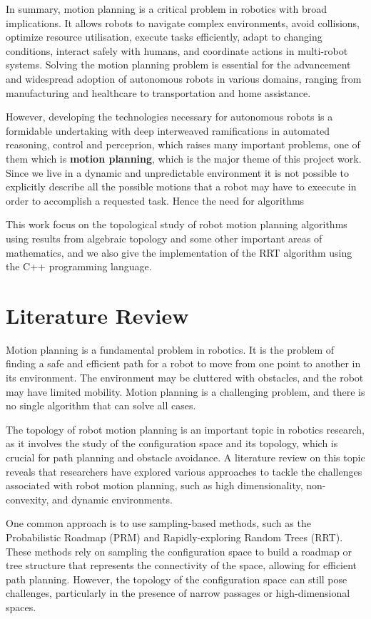 In summary, motion planning is a critical problem in robotics with broad implications. It allows robots to navigate complex environments, avoid collisions, optimize resource utilisation, execute tasks efficiently, adapt to changing conditions, interact safely with humans, and coordinate actions in multi-robot systems. Solving the motion planning problem is essential for the advancement and widespread adoption of autonomous robots in various domains, ranging from manufacturing and healthcare to transportation and home assistance.

However, developing the technologies necessary for autonomous robots is a formidable undertaking with deep interweaved ramifications in automated reasoning, control and perceprion, which raises many important problems, one of them which is \textbf{motion planning}, which is the major theme of this project work. Since we live in a dynamic and unpredictable environment it is not possible to explicitly describe all the possible motions that a robot may have to exeecute in order to accomplish a requested task. Hence the need for algorithms

This work focus on the topological study of robot motion planning algorithms using results from algebraic topology and some other important areas of mathematics, and we also give the implementation of the RRT algorithm using the C++ programming language.

\section{Literature Review}
Motion planning is a fundamental problem in robotics. It is the problem of finding a safe and efficient path for a robot to move from one point to another in its environment. The environment may be cluttered with obstacles, and the robot may have limited mobility. Motion planning is a challenging problem, and there is no single algorithm that can solve all cases.

The topology of robot motion planning is an important topic in robotics research, as it involves the study of the configuration space and its topology, which is crucial for path planning and obstacle avoidance. A literature review on this topic reveals that researchers have explored various approaches to tackle the challenges associated with robot motion planning, such as high dimensionality, non-convexity, and dynamic environments.

One common approach is to use sampling-based methods, such as the Probabilistic Roadmap (PRM) and Rapidly-exploring Random Trees (RRT). These methods rely on sampling the configuration space to build a roadmap or tree structure that represents the connectivity of the space, allowing for efficient path planning. However, the topology of the configuration space can still pose challenges, particularly in the presence of narrow passages or high-dimensional spaces.


